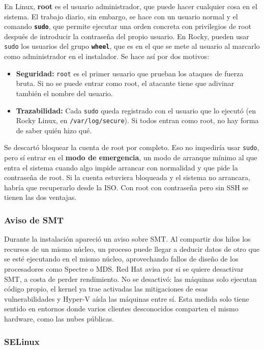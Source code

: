 \documentclass[11pt, a4paper, titlepage]{article}
\newcommand{\cod}[1]{\texttt{#1}}
\begin{document}
En Linux, \textbf{root} es el usuario administrador, que puede hacer cualquier cosa en el sistema. El trabajo diario, sin embargo, se hace con un usuario normal y el comando \textbf{\cod{sudo}}, que permite ejecutar una orden concreta con privilegios de root después de introducir la contraseña del propio usuario. En Rocky, pueden usar \cod{sudo} los usuarios del grupo \textbf{\cod{wheel}}, que es en el que se mete al usuario al marcarlo como administrador en el instalador. Se hace así por dos motivos:

\begin{itemize}
    \item \textbf{Seguridad:} \cod{root} es el primer usuario que prueban los ataques de fuerza bruta. Si no se puede entrar como root, el atacante tiene que adivinar también el nombre del usuario.
    \item \textbf{Trazabilidad:} Cada \cod{sudo} queda registrado con el usuario que lo ejecutó (en Rocky Linux, en \cod{/var/log/secure}). Si todos entran como root, no hay forma de saber quién hizo qué.
\end{itemize}

Se descartó bloquear la cuenta de root por completo. Eso no impediría usar \cod{sudo}, pero sí entrar en el \textbf{modo de emergencia}, un modo de arranque mínimo al que entra el sistema cuando algo impide arrancar con normalidad y que pide la contraseña de root. Si la cuenta estuviera bloqueada y el sistema no arrancara, habría que recuperarlo desde la ISO. Con root con contraseña pero sin SSH se tienen las dos ventajas.

\subsubsection{Aviso de SMT}

Durante la instalación apareció un aviso sobre SMT. Al compartir dos hilos los recursos de un mismo núcleo, un proceso puede llegar a deducir datos de otro que se esté ejecutando en el mismo núcleo, aprovechando fallos de diseño de los procesadores como Spectre o MDS. Red Hat avisa por si se quiere desactivar SMT, a costa de perder rendimiento. No se desactivó: las máquinas solo ejecutan código propio, el kernel ya trae activadas las mitigaciones de esas vulnerabilidades y Hyper-V aísla las máquinas entre sí. Esta medida solo tiene sentido en entornos donde varios clientes desconocidos comparten el mismo hardware, como las nubes públicas.

\subsubsection{SELinux}
\label{sec:selinux}
\end{document}
